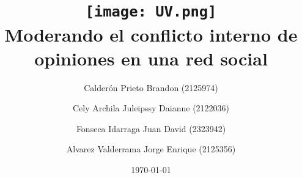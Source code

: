 \title{
	\texttt{[image: UV.png]} \\[1cm]
	Moderando el conflicto interno de opiniones en una red social
}
\author{
	Calderón Prieto Brandon (2125974) \and
	Cely Archila Juleipssy Daianne (2122036) \and
	Fonseca Idarraga Juan David (2323942) \and
	Alvarez Valderrama Jorge Enrique (2125356)
}
\date{\today}
